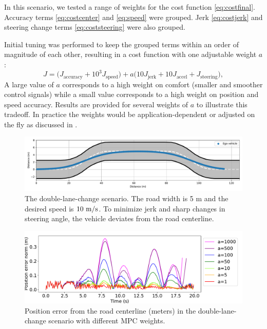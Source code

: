 \documentclass[letterpaper, 10 pt, conference]{ieeeconf}  %
\begin{document}
In this scenario, we tested a range of weights for the cost function \eqref{eq:costfinal}. Accuracy terms \eqref{eq:costcenter} and \eqref{eq:speed} were grouped. Jerk \eqref{eq:costjerk} and steering change terms \eqref{eq:coststeering} were also grouped.
 
 Initial tuning was performed to keep the grouped terms within an order of magnitude of each other, resulting in a cost function with one adjustable weight $a$:
 $$J = \Big( J_{\text{accuracy}} + 10^3J_{\text{speed}} \Big) + a\Big( 10J_\text{{jerk}} + 10J_\text{{accel}} + J_{\text{steering}}\Big),$$
 A large value of $a$ corresponds to a high weight on comfort (smaller and smoother control signals) while a small value corresponds to a high weight on position and speed accuracy.
 Results are provided for several weights of $a$ to illustrate this tradeoff.
 In practice the weights would be application-dependent or adjusted on the fly as discussed in \cite{nmpc_micheli}.
 
 
 \begin{figure}[h]
 	\centering
 	\includegraphics[width=1.0\linewidth]{figures/double_lane_change.pdf}
 	\caption{The double-lane-change scenario. The road width is 5 m and the desired speed is $10\ \text{m}/\text{s}$. To minimize jerk and sharp changes in steering angle, the vehicle deviates from the road centerline.}
 	\label{fig:trajectory(lanechange)}
 \end{figure}
 
 
 \begin{figure}[h]
 	\centering
 	\includegraphics[width=1.0\linewidth]{figures/Position_error(lanechange).pdf}
 	\caption{Position error from the road centerline (meters) in the double-lane-change scenario with different MPC weights.}
 	\label{fig:error(lanechange)}
 \end{figure}
 
\end{document}

